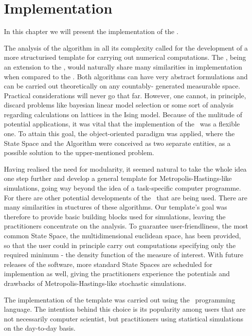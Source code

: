\chapter{ Implementation }

In this chapter we will present the implementation of the \PT. 

The analysis of the algorithm in all its complexity called for the development
of a more structurised template for carrying out numerical computations. The
\PT, being an extension to the \MH, would naturally share many similarities in
implementation when compared to the \PT. Both algorithms can have very
abstract formulations and can be carried out theoretically on any countably-
generated measurable space. Practical considerations will never go that far.
However, one cannot, in principle, discard problems like bayesian linear model
selection or some sort of analysis regarding calculations on lattices in the
Ising model. Because of the mulitude of potential applications, it was vital
that the implemention of the \PT\, was a flexible one. To attain
this goal, the object-oriented paradigm was applied, where the State Space and the Algorithm were conceived as two separate entities, as a possible
solution to the upper-mentioned problem.

Having realised the need for modularity, it seemed natural to take the whole idea one step further and develop a general template for Metropolis-Hastings-like simulations, going way beyond the idea of a task-specific computer programme. For there are other potential developments of the \MH\, that are being used. There are many similarities in stuctures of these algorithms. Our template's goal was therefore to provide basic building blocks used for simulations, leaving the practitioners concentrate on the analysis. To guarantee user-friendliness, the most common State Space, the multidimensional euclidean space, has been provided, so that the user could in principle carry out computations specifying only the required minimum - the density function of the measure of interest. With future releases of the software, more standard State Spaces are scheduled for implemention as well, giving the practitioners experience the potentials and drawbacks of Metropolis-Hastings-like stochastic simulations.

The implementation of the template was carried out using the \RR\, programming language. The intention behind this choice is its popularity among users that are not necessarily computer scientist, but practitioners using statistical simulations on the day-to-day basis. 

